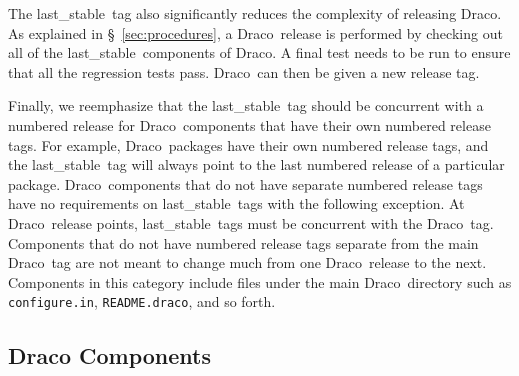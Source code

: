 \documentclass[11pt]{nmemo}
\newcommand{\draco}{{\normalfont\normalsize\sffamily Draco}}
\newcommand{\stable}{{\normalfont\normalsize\ttfamily last\_stable}}
\begin{document}
The \stable\ tag also significantly reduces the complexity of releasing
\draco.  As explained in \S~\ref{sec:procedures}, a \draco\ release is 
performed by checking out all of the \stable\ components of \draco.  A 
final test needs to be run to ensure that all the regression tests
pass.  \draco\ can then be given a new release tag.

Finally, we reemphasize that the \stable\ tag should be concurrent
with a numbered release for \draco\ components that have their own
numbered release tags.  For example, \draco\ packages have their own
numbered release tags, and the \stable\ tag will always point to the
last numbered release of a particular package.  \draco\ components
that do not have separate numbered release tags have no requirements
on \stable\ tags with the following exception.  At \draco\ release
points, \stable\ tags must be concurrent with the \draco\ tag.
Components that do not have numbered release tags separate from the
main \draco\ tag are not meant to change much from one \draco\ release
to the next.  Components in this category include files under the main
\draco\ directory such as \texttt{configure.in},
\texttt{README.draco}, and so forth.

\subsection{Draco Components}
\end{document}
